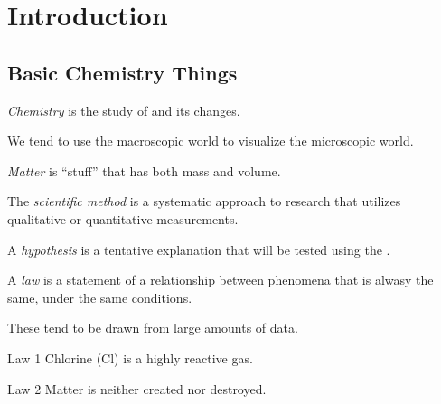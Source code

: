 \section{Introduction} \label{sec:Introduction}
\subsection{Basic Chemistry Things} \label{subsec:Basic Chemistry Things}
\begin{definition}[Chemistry] \label{def:Chemistry}
  \emph{Chemistry} is the study of  and its changes.
  \begin{remark}
    We tend to use the macroscopic world to visualize the microscopic world.
  \end{remark}
\end{definition}

\begin{definition}[Matter] \label{def:Matter}
  \emph{Matter} is ``stuff'' that has both mass and volume.
\end{definition}

\begin{definition} \label{def:Scientific Method}
  The \emph{scientific method} is a systematic approach to research that utilizes qualitative or quantitative measurements.
\end{definition}

\begin{definition}[Hypothesis] \label{def:Hypothesis}
  A \emph{hypothesis} is a tentative explanation that will be tested using the .
\end{definition}

\begin{definition}[Law] \label{def:Law}
  A \emph{law} is a statement of a relationship between phenomena that is alwasy the same, under the same conditions.
  \begin{remark}
    These tend to be drawn from large amounts of data.
  \end{remark}
\end{definition}

\begin{example}[]{Law 1}
  Chlorine (Cl) is a highly reactive gas.
\end{example}

\begin{example}[]{Law 2}
  Matter is neither created nor destroyed.
\end{example}

